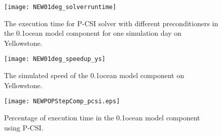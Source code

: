 \begin {figure}[t!]
\texttt{[image: NEW01deg\_solverruntime]}
\caption []{The execution time for P-CSI solver with different preconditioners in the 0.1\degree\space ocean model component for one simulation day on Yellowstone.\label {fig:runtime01}}
\end {figure}

\begin {figure}[t!]
\texttt{[image: NEW01deg\_speedup\_ys]}
\caption []{The  simulated speed of the 0.1\degree\space ocean model component on Yellowstone.\label {fig:simrate01}}
\end {figure}

\begin {figure}[t!]
\centering
\texttt{[image: NEWPOPStepComp\_pcsi.eps]}
\caption[] {Percentage of execution time in the 0.1\degree\space ocean model component using P-CSI.\label{fig:StepComp_pcsi}}
\end{figure}
